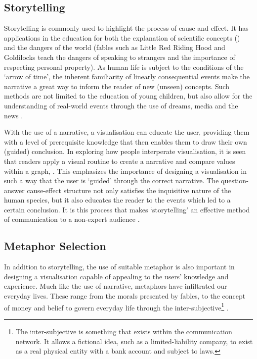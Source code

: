 \subsection{Storytelling}\label{sec:storytelling}

Storytelling is commonly used to highlight the process of cause and effect. It has applications in the education for both the explanation of scientific concepts (\citep{marsstory}) and the dangers of the world (fables such as Little Red Riding Hood and Goldilocks teach the dangers of speaking to strangers and the importance of respecting personal property). As human life is subject to the conditions of the `arrow of time', the inherent familiarity of linearly consequential events make the narrative a great way to inform the reader of new (unseen) concepts. Such methods are not limited to the education of young children, but also allow for the understanding of real-world events through the use of dreams, media and the news \citep{storyanimal,dream}.

With the use of a narrative, a visualisation can educate the user, providing them with a level of prerequisite knowledge that then enables them to draw their own (guided) conclusion. In exploring how people interperate visualisation, it is seen that readers apply a visual routine to create a narrative and compare values within a graph, \citep{eyestory}. This emphasizes the importance of designing a visualisation in such a way that the user is `guided' through the correct narrative. The question-answer cause-effect structure not only satisfies the inquisitive nature of the human species, but it also educates the reader to the events which led to a certain conclusion. It is this process that makes `storytelling' an effective method of communication to a non-expert audience \citep{nonscientific}.


\subsection{Metaphor Selection}\label{sec:metaphor}
In addition to storytelling, the use of suitable metaphor is also important in designing a visualisation capable of appealing to the users' knowledge and experience.  Much like the use of narrative, metaphors have infiltrated our everyday lives. These range from the morals presented by fables, to the concept of money and belief to govern everyday life through the inter-subjective\footnote{The inter-subjective is something that exists within the communication network. It allows a fictional idea, such as a limited-liability company, to exist as a real physical entity with a bank account and subject to laws. } \citep{sapiens}.

